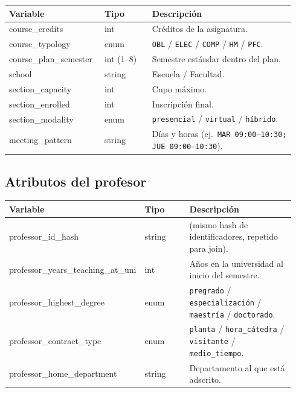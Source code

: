 \documentclass[11pt,a4paper]{article}
\begin{document}
\begin{longtable}{@{}>{\ttfamily}p{0.30\linewidth}p{0.16\linewidth}p{0.48\linewidth}@{}}
\toprule
\rmfamily\textbf{Variable} & \textbf{Tipo} & \textbf{Descripción} \\
\midrule
\endhead
course\_credits        & int   & Créditos de la asignatura. \\
course\_typology       & enum  & \texttt{OBL} / \texttt{ELEC} / \texttt{COMP} / \texttt{HM} / \texttt{PFC}. \\
course\_plan\_semester & int (1--8) & Semestre estándar dentro del plan. \\
school                 & string & Escuela / Facultad. \\
section\_capacity      & int   & Cupo máximo. \\
section\_enrolled      & int   & Inscripción final. \\
section\_modality      & enum  & \texttt{presencial} / \texttt{virtual} / \texttt{híbrido}. \\
meeting\_pattern       & string & Días y horas (ej.\ \texttt{MAR 09:00--10:30; JUE 09:00--10:30}). \\
\bottomrule
\end{longtable}

\subsection{Atributos del profesor}

\begin{longtable}{@{}>{\ttfamily}p{0.34\linewidth}p{0.18\linewidth}p{0.42\linewidth}@{}}
\toprule
\rmfamily\textbf{Variable} & \textbf{Tipo} & \textbf{Descripción} \\
\midrule
\endhead
professor\_id\_hash               & string & (mismo hash de identificadores, repetido para join). \\
professor\_years\_teaching\_at\_uni & int  & Años en la universidad al inicio del semestre. \\
professor\_highest\_degree        & enum   & \texttt{pregrado} / \texttt{especialización} / \texttt{maestría} / \texttt{doctorado}. \\
professor\_contract\_type         & enum   & \texttt{planta} / \texttt{hora\_cátedra} / \texttt{visitante} / \texttt{medio\_tiempo}. \\
professor\_home\_department       & string & Departamento al que está adscrito. \\
\bottomrule
\end{longtable}
\end{document}
